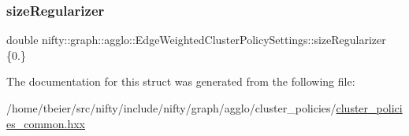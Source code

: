 \subsubsection{\texorpdfstring{size\+Regularizer}{sizeRegularizer}}
{\footnotesize\ttfamily double nifty\+::graph\+::agglo\+::\+Edge\+Weighted\+Cluster\+Policy\+Settings\+::size\+Regularizer \{0.\}}



The documentation for this struct was generated from the following file\+:\begin{DoxyCompactItemize}
\item 
/home/tbeier/src/nifty/include/nifty/graph/agglo/cluster\+\_\+policies/\hyperlink{cluster__policies__common_8hxx}{cluster\+\_\+policies\+\_\+common.\+hxx}\end{DoxyCompactItemize}
